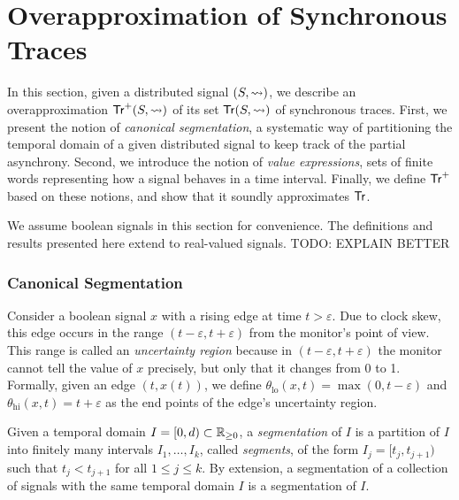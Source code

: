 \section{Overapproximation of Synchronous Traces} \label{sec:approach}
In this section, given a distributed signal $(S,{\rightsquigarrow})$, we describe an overapproximation $\mathsf{Tr}^+(S,{\rightsquigarrow})$ of its set $\mathsf{Tr}(S,{\rightsquigarrow})$ of synchronous traces.
First, we present the notion of \emph{canonical segmentation}, a systematic way of partitioning the temporal domain of a given distributed signal to keep track of the partial asynchrony.
Second, we introduce the notion of \emph{value expressions}, sets of finite words representing how a signal behaves in a time interval.
Finally, we define $\mathsf{Tr}^+$ based on these notions, and show that it soundly approximates $\mathsf{Tr}$.

\begin{remark}
	We assume boolean signals in this section for convenience.
	The definitions and results presented here extend to real-valued signals.
	\alert{TODO: EXPLAIN BETTER}
\end{remark}

\subsubsection{Canonical Segmentation}
Consider a boolean signal $x$ with a rising edge at time $t > \varepsilon$.
Due to clock skew, this edge occurs in the range $(t - \varepsilon, t + \varepsilon)$ from the monitor's point of view.
This range is called an \emph{uncertainty region} because in $(t - \varepsilon, t + \varepsilon)$ the monitor cannot tell the value of $x$ precisely, but only that it changes from 0 to 1.
Formally, given an edge $(t, x(t))$, we define $\theta_{\text{lo}}(x,t) = \max(0, t - \varepsilon)$ and $\theta_{\text{hi}}(x,t) = t + \varepsilon$ as the end points of the edge's uncertainty region.

Given a temporal domain $I = [0,d) \subset \mathbb{R}_{\geq 0}$, a \emph{segmentation} of $I$ is a partition of $I$ into finitely many intervals $I_1, \ldots, I_k$, called \emph{segments}, of the form $I_j = [t_j, t_{j+1})$ such that $t_j < t_{j+1}$ for all $1 \leq j \leq k$.
By extension, a segmentation of a collection of signals with the same temporal domain $I$ is a segmentation of $I$.

